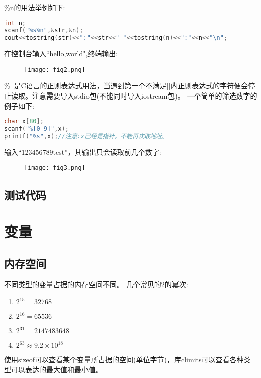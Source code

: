 \documentclass{article}
\begin{document}
    \%n的用法举例如下:
    \begin{lstlisting}[language=c++]
int n;
scanf("%s%n",&str,&n);
cout<<tostring(str)<<":"<<str<<" "<<tostring(n)<<":"<<n<<"\n";
    \end{lstlisting}
    在控制台输入``hello,world",终端输出:
    \begin{figure}[H]
        \centering
        \texttt{[image: fig2.png]}
    \end{figure}

    \%[]是C语言的正则表达式用法，当遇到第一个不满足[]内正则表达式的字符便会停止读取。注意需要导入stdio包(不能同时导入iostream包)。
    一个简单的筛选数字的例子如下:

    \begin{lstlisting}[language=c++]
char x[80];
scanf("%[0-9]",x);
printf("%s",x);//注意:x已经是指针，不能再次取地址。
    \end{lstlisting}

    输入``123456789test''，其输出只会读取前几个数字:
    \begin{figure}[H]
        \centering
        \texttt{[image: fig3.png]}
    \end{figure}
    
    \subsection{测试代码}
    

    \section{变量}
    \subsection{内存空间}
        不同类型的变量占据的内存空间不同。
        几个常见的2的幂次:
        \begin{enumerate}
            \item $2^{15} = 32768$
            \item $2^{16} = 65536$
            \item $2^{31} = 2147483648$
            \item $2^{63} \approx 9.2\times 10^18$
        \end{enumerate}
    
        使用sizeof可以查看某个变量所占据的空间(单位字节)，库climits可以查看各种类型可以表达的最大值和最小值。
\end{document}
